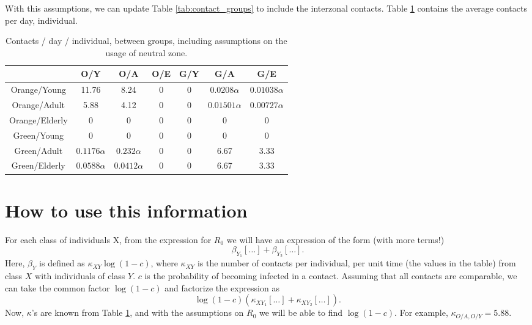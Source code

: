 \documentclass{article}
\begin{document}
With this assumptions, we can update Table \ref{tab:contact_groups} to include
the interzonal contacts. Table \ref{tab:interzonal} contains the average
contacts per day, individual.

\begin{table}[h!]
\begin{center}
\begin{tabular}{|c|c|c|c|c|c|c| } 
 \hline
               & O/Y & O/A & O/E & G/Y & G/A & G/E \\ 
\hline
Orange/Young   & 11.76          & 8.24            & 0              & 0           & $0.0208\alpha$   & $0.01038\alpha$ \\ 
\hline
Orange/Adult   & 5.88           & 4.12            & 0              & 0           & $ 0.01501\alpha$ & $0.00727\alpha$ \\ 
\hline
Orange/Elderly & 0              & 0               & 0              & 0           & 0                & 0 \\ 
\hline
Green/Young    & 0              & 0               & 0              & 0           & 0                & 0 \\ 
\hline
Green/Adult    & $0.1176\alpha$ & $0.232\alpha$   & 0              & 0           & 6.67             & 3.33 \\ 
\hline
Green/Elderly  & $0.0588\alpha$ & $0.0412\alpha$  & 0              & 0           & 6.67             & 3.33 \\ 
\hline
\end{tabular}
\caption{Contacts / day / individual, between groups, including assumptions on
the usage of neutral zone.}
\label{tab:interzonal}
\end{center}
\end{table}

\section{How to use this information}

For each class of individuals X, from the expression for $R_0$ we will have an expression of
the form (with more terms!)
\[
    \beta_{Y_1} [\ldots] + \beta_{Y_2} [\ldots].
\]
Here, $\beta_Y$ is defined as $\kappa_{XY}\log(1-c)$, where $\kappa_{XY}$ is
the number of contacts per individual, per unit time (the values in the table)
from class $X$ with individuals of class $Y$. $c$ is the probability of
becoming infected in a contact. Assuming that all contacts are comparable, we can take the common factor 
$\log(1-c)$ and factorize the expression as
\[
    \log(1-c) \left( \kappa_{XY_1} [\ldots]+ \kappa_{XY_2} [\ldots] \right).
\]
Now, $\kappa$'s are known from Table \ref{tab:interzonal}, and with the
assumptions on $R_0$ we will be able to find $\log(1-c)$. For example,
$\kappa_{O/A,O/Y} = 5.88$.
\end{document}
